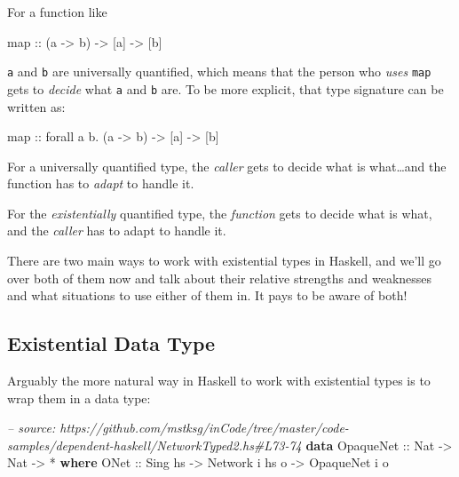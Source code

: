 \documentclass[]{article}
\newenvironment{Shaded}{}{}
\newcommand{\KeywordTok}[1]{\textcolor[rgb]{0.00,0.44,0.13}{\textbf{{#1}}}}
\newcommand{\DataTypeTok}[1]{\textcolor[rgb]{0.56,0.13,0.00}{{#1}}}
\newcommand{\CommentTok}[1]{\textcolor[rgb]{0.38,0.63,0.69}{\textit{{#1}}}}
\newcommand{\OtherTok}[1]{\textcolor[rgb]{0.00,0.44,0.13}{{#1}}}
\newcommand{\FunctionTok}[1]{\textcolor[rgb]{0.02,0.16,0.49}{{#1}}}
\newcommand{\NormalTok}[1]{{#1}}
\begin{document}
For a function like

\begin{Shaded}
\begin{Highlighting}[]
\NormalTok{map}\OtherTok{ ::} \NormalTok{(a }\OtherTok{->} \NormalTok{b) }\OtherTok{->} \NormalTok{[a] }\OtherTok{->} \NormalTok{[b]}
\end{Highlighting}
\end{Shaded}

\texttt{a} and \texttt{b} are universally quantified, which means that the
person who \emph{uses} \texttt{map} gets to \emph{decide} what \texttt{a} and
\texttt{b} are. To be more explicit, that type signature can be written as:

\begin{Shaded}
\begin{Highlighting}[]
\NormalTok{map}\OtherTok{ ::} \NormalTok{forall a b}\FunctionTok{.} \NormalTok{(a }\OtherTok{->} \NormalTok{b) }\OtherTok{->} \NormalTok{[a] }\OtherTok{->} \NormalTok{[b]}
\end{Highlighting}
\end{Shaded}

For a universally quantified type, the \emph{caller} gets to decide what is
what\ldots{}and the function has to \emph{adapt} to handle it.

For the \emph{existentially} quantified type, the \emph{function} gets to decide
what is what, and the \emph{caller} has to adapt to handle it.

There are two main ways to work with existential types in Haskell, and we'll go
over both of them now and talk about their relative strengths and weaknesses and
what situations to use either of them in. It pays to be aware of both!

\subsection{Existential Data Type}\label{existential-data-type}

Arguably the more natural way in Haskell to work with existential types is to
wrap them in a data type:

\begin{Shaded}
\begin{Highlighting}[]
\CommentTok{-- source: https://github.com/mstksg/inCode/tree/master/code-samples/dependent-haskell/NetworkTyped2.hs#L73-74}
\KeywordTok{data} \DataTypeTok{OpaqueNet}\OtherTok{ ::} \DataTypeTok{Nat} \OtherTok{->} \DataTypeTok{Nat} \OtherTok{->} \FunctionTok{*} \KeywordTok{where}
    \DataTypeTok{ONet}\OtherTok{ ::} \DataTypeTok{Sing} \NormalTok{hs }\OtherTok{->} \DataTypeTok{Network} \NormalTok{i hs o }\OtherTok{->} \DataTypeTok{OpaqueNet} \NormalTok{i o}
\end{Highlighting}
\end{Shaded}
\end{document}
